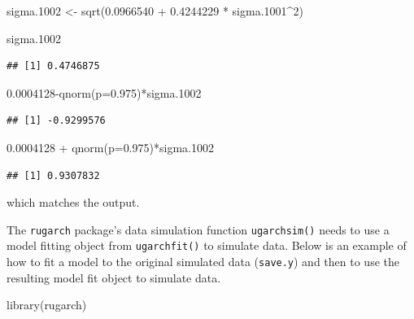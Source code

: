 \documentclass[
]{book}
\newenvironment{Shaded}{\begin{snugshade}}{\end{snugshade}}
\newcommand{\AttributeTok}[1]{\textcolor[rgb]{0.77,0.63,0.00}{#1}}
\newcommand{\DecValTok}[1]{\textcolor[rgb]{0.00,0.00,0.81}{#1}}
\newcommand{\FloatTok}[1]{\textcolor[rgb]{0.00,0.00,0.81}{#1}}
\newcommand{\FunctionTok}[1]{\textcolor[rgb]{0.00,0.00,0.00}{#1}}
\newcommand{\NormalTok}[1]{#1}
\newcommand{\OtherTok}[1]{\textcolor[rgb]{0.56,0.35,0.01}{#1}}
\newcommand{\SpecialCharTok}[1]{\textcolor[rgb]{0.00,0.00,0.00}{#1}}
\theoremstyle{definition}
\theoremstyle{definition}
\theoremstyle{definition}
\theoremstyle{definition}
\theoremstyle{remark}
\begin{document}
\begin{Shaded}
\begin{Highlighting}[]
\NormalTok{sigma}\FloatTok{.1002} \OtherTok{\textless{}{-}} \FunctionTok{sqrt}\NormalTok{(}\FloatTok{0.0966540} \SpecialCharTok{+} \FloatTok{0.4244229} \SpecialCharTok{*}\NormalTok{ sigma}\FloatTok{.1001}\SpecialCharTok{\^{}}\DecValTok{2}\NormalTok{)}

\NormalTok{sigma}\FloatTok{.1002}
\end{Highlighting}
\end{Shaded}

\begin{verbatim}
## [1] 0.4746875
\end{verbatim}

\begin{Shaded}
\begin{Highlighting}[]
\FloatTok{0.0004128}\SpecialCharTok{{-}}\FunctionTok{qnorm}\NormalTok{(}\AttributeTok{p=}\FloatTok{0.975}\NormalTok{)}\SpecialCharTok{*}\NormalTok{sigma}\FloatTok{.1002}
\end{Highlighting}
\end{Shaded}

\begin{verbatim}
## [1] -0.9299576
\end{verbatim}

\begin{Shaded}
\begin{Highlighting}[]
\FloatTok{0.0004128} \SpecialCharTok{+} \FunctionTok{qnorm}\NormalTok{(}\AttributeTok{p=}\FloatTok{0.975}\NormalTok{)}\SpecialCharTok{*}\NormalTok{sigma}\FloatTok{.1002}
\end{Highlighting}
\end{Shaded}

\begin{verbatim}
## [1] 0.9307832
\end{verbatim}

which matches the output.

The \texttt{rugarch} package's data simulation function \texttt{ugarchsim()} needs to use a model fitting object from \texttt{ugarchfit()} to simulate data. Below is an example of how to fit a model to the original simulated data (\texttt{save.y}) and then to use the resulting model fit object to simulate data.

\begin{Shaded}
\begin{Highlighting}[]
\FunctionTok{library}\NormalTok{(rugarch)}
\end{Highlighting}
\end{Shaded}
\end{document}
